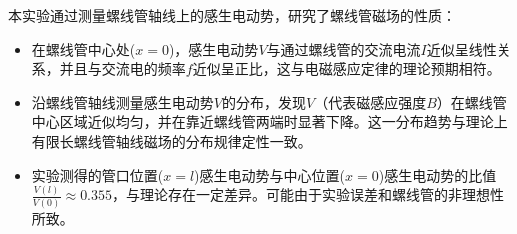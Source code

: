 \documentclass[12pt,a4paper]{article}
\begin{document}
	本实验通过测量螺线管轴线上的感生电动势，研究了螺线管磁场的性质：
	\begin{itemize}
		\item 在螺线管中心处($x=0$)，感生电动势$V$与通过螺线管的交流电流$I$近似呈线性关系，并且与交流电的频率$f$近似呈正比，这与电磁感应定律的理论预期相符。
		\item 沿螺线管轴线测量感生电动势$V$的分布，发现$V$（代表磁感应强度$B$）在螺线管中心区域近似均匀，并在靠近螺线管两端时显著下降。这一分布趋势与理论上有限长螺线管轴线磁场的分布规律定性一致。
		\item 实验测得的管口位置($x=l$)感生电动势与中心位置($x=0$)感生电动势的比值$\frac{V(l)}{V(0)} \approx 0.355$，与理论存在一定差异。可能由于实验误差和螺线管的非理想性所致。
	\end{itemize}
\end{document}
